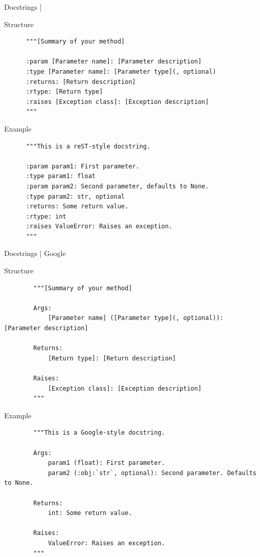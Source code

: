 \begin{frame}[fragile]{%
    Docstrings | \reST
    \hfill
  }
  \begin{block}{Structure}
    \footnotesize
    \begin{verbatim}
      """[Summary of your method]

      :param [Parameter name]: [Parameter description]
      :type [Parameter name]: [Parameter type](, optional)
      :returns: [Return description]
      :rtype: [Return type]
      :raises [Exception class]: [Exception description]
      """
    \end{verbatim}
  \end{block}
  \begin{block}{Example}
    \footnotesize
    \begin{verbatim}
      """This is a reST-style docstring.

      :param param1: First parameter.
      :type param1: float
      :param param2: Second parameter, defaults to None.
      :type param2: str, optional
      :returns: Some return value.
      :rtype: int
      :raises ValueError: Raises an exception.
      """
    \end{verbatim}
  \end{block}
\end{frame}

\begin{frame}[fragile]{%
    Docstrings | Google
    \hfill
  }
  \begin{block}{Structure}
    \footnotesize
      \begin{verbatim}
        """[Summary of your method]

        Args:
            [Parameter name] ([Parameter type](, optional)): [Parameter description]

        Returns:
            [Return type]: [Return description]

        Raises:
            [Exception class]: [Exception description]
        """
      \end{verbatim}
    \end{block}
    \begin{block}{Example}
    \footnotesize
      \begin{verbatim}
        """This is a Google-style docstring.

        Args:
            param1 (float): First parameter.
            param2 (:obj:`str`, optional): Second parameter. Defaults to None.

        Returns:
            int: Some return value.

        Raises:
            ValueError: Raises an exception.
        """
      \end{verbatim}
  \end{block}
\end{frame}

